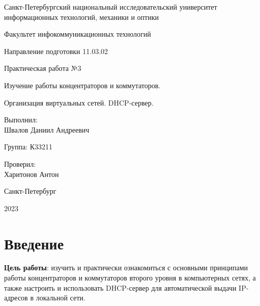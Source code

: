 \documentclass[a4paper, 14pt]{extarticle}
\begin{document}
\begin{titlepage}
  \vspace{0pt plus2fill}
  \noindent

  \vspace{0pt plus6fill}
  \begin{center}
    Санкт-Петербургский национальный исследовательский университет
    информационных технологий, механики и оптики

    \vspace{0pt plus3fill}

    Факультет инфокоммуникационных технологий

    Направление подготовки 11.03.02

    \vspace{0pt plus2fill}

    Практическая работа №3

    \vspace{0pt plus1fill}

    Изучение работы концентраторов и коммутаторов.

    Организация виртуальных сетей. DHCP-сервер.

  \end{center}

  \vspace{0pt plus7fill}
  \begin{flushright}
    Выполнил: \\
    Швалов Даниил Андреевич

    Группа: К33211

    Проверил: \\
    Харитонов Антон
  \end{flushright}

  \vspace{0pt plus2fill}
  \begin{center}
    Санкт-Петербург

    2023
  \end{center}
\end{titlepage}

\setcounter{page}{2}

\section{Введение}

\textbf{Цель работы}: изучить и практически ознакомиться с основными принципами
работы концентраторов и коммутаторов второго уровня в компьютерных сетях, а
также настроить и использовать DHCP-сервер для автоматической выдачи IP-адресов
в локальной сети.
\end{document}
